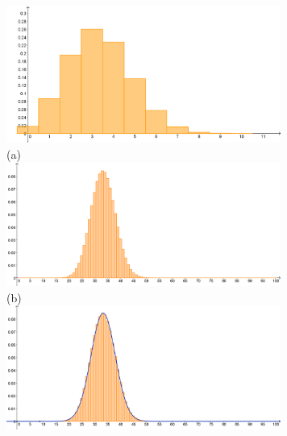 \begin{figure}[p]
\begin{center}
\begin{enColor}
\includegraphics[width=9cm]{../fig/Cap05-HistogramaBinomial01.png}\\
(a)\\
\includegraphics[width=9cm]{../fig/Cap05-HistogramaBinomial02.png}\\
(b)\\
\includegraphics[width=9cm]{../fig/Cap05-HistogramaBinomial03.png}\\

\end{enColor}
\end{center}
\end{figure}
